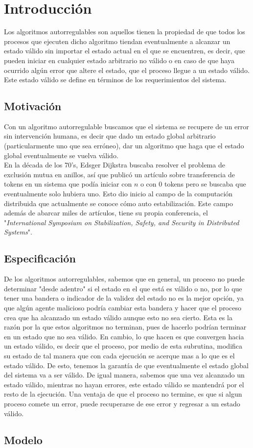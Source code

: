 \documentclass[12pt,a4paper]{article}
\begin{document}
\section{Introducción}{
    Los algoritmos autorregulables son aquellos tienen la propiedad de que todos los procesos que ejecuten dicho algoritmo tiendan eventualmente a alcanzar un estado válido sin importar el estado actual en el que se encuentren, es decir, que pueden iniciar en cualquier estado arbitrario no válido o en caso de que haya ocurrido algún error que altere el estado, que el proceso llegue a un estado válido. Este estado válido se define en términos de los requerimientos del sistema.
\subsection{Motivación}{
    Con un algoritmo autorregulable buscamos que el sistema se recupere de un error sin intervención humana, es decir que dado un estado global arbitrario (particularmente uno que sea erróneo), dar un algoritmo que haga que el estado global eventualmente se vuelva válido.\\
    \indent En la década de los 70's, Edsger Dijkstra buscaba resolver el problema de exclusión mutua en anillos, así que publicó un artículo sobre transferencia de tokens en un sistema que podía iniciar con $n$ o con $0$ tokens pero se buscaba que eventualmente solo hubiera uno. Esto dio inicio al campo de la computación distribuida que actualmente se conoce cómo auto estabilización. Este campo además de abarcar miles de artículos, tiene su propia conferencia, el "\textit{International Symposium on Stabilization, Safety, and Security in Distributed Systems}".
}
\subsection{Especificación}{
    De los algoritmos autorregulables, sabemos que en general, un proceso no puede determinar "desde adentro" si el estado en el que está es válido o no, por lo que tener una bandera o indicador de la validez del estado no es la mejor opción, ya que algún agente malicioso podría cambiar esta bandera y hacer que el proceso crea que ha alcanzado un estado válido aunque esto no sea cierto. Esta es la razón por la que estos algoritmos no terminan, pues de hacerlo podrían terminar en un estado que no sea válido. En cambio, lo que hacen es que convergen hacia un estado válido, es decir que el proceso, por medio de esta subrutina, modifica su estado de tal manera que con cada ejecución se acerque mas a lo que es el estado válido. De esto, tenemos la garantía de que eventualmente el estado global del sistema va a ser válido. De igual manera, sabemos que una vez alcanzado un estado válido, mientras no hayan errores, este estado válido se mantendrá por el resto de la ejecución. Una ventaja de que el proceso no termine, es que si algun proceso comete un error, puede recuperarse de ese error y regresar a un estado válido.

}
\subsection{Modelo}{
    
}
}
\end{document}
